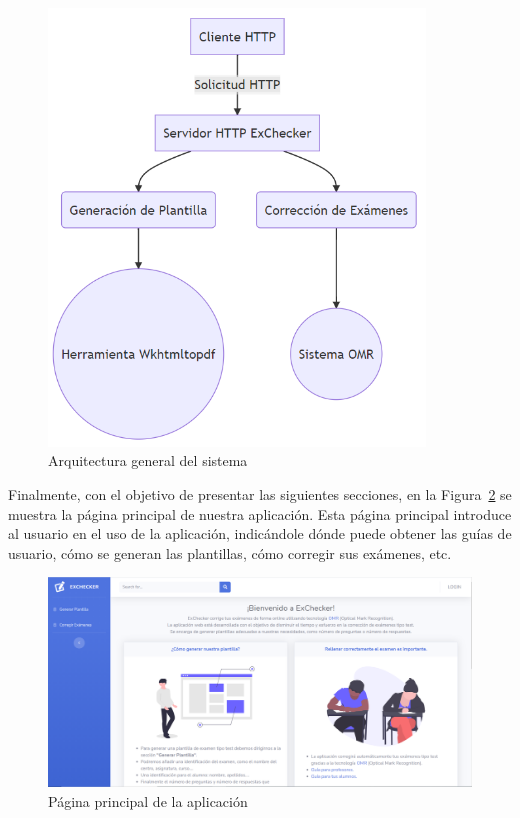 \documentclass[a4paper, 12pt]{book}
\begin{document}
\begin{figure}
  \centering
  \includegraphics[width=10cm, keepaspectratio]{img/arquitectura}
  \caption{Arquitectura general del sistema}
  \label{figura:arquitectura}
\end{figure}

Finalmente, con el objetivo de presentar las siguientes secciones,
en la Figura~\ref{figura:pagina_principal} se muestra la página
principal de nuestra aplicación.
Esta página principal introduce al usuario en el uso de la aplicación,
indicándole dónde puede obtener las guías de usuario, cómo se generan
las plantillas, cómo corregir sus exámenes, etc.

\begin{figure}
  \centering
  \includegraphics[width=12cm, keepaspectratio]{img/pagina_principal}
  \caption{Página principal de la aplicación}
  \label{figura:pagina_principal}
\end{figure}
\end{document}
